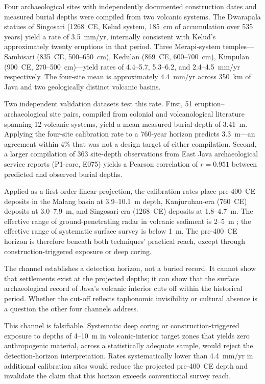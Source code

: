 \documentclass[12pt,a4paper]{article}
\begin{document}
Four archaeological sites with independently documented construction dates and measured burial depths were compiled from two volcanic systems. The Dwarapala statues of Singosari (1268~CE, Kelud system, 185~cm of accumulation over 535 years) yield a rate of 3.5~mm/yr, internally consistent with Kelud's approximately twenty eruptions in that period. Three Merapi-system temples---Sambisari (835~CE, 500--650~cm), Kedulan (869~CE, 600--700~cm), Kimpulan (900~CE, 270--500~cm)---yield rates of 4.4--5.7, 5.3--6.2, and 2.4--4.5~mm/yr respectively. The four-site mean is approximately 4.4~mm/yr across 350~km of Java and two geologically distinct volcanic basins.

Two independent validation datasets test this rate. First, 51 eruption--archaeological site pairs, compiled from colonial and volcanological literature spanning 12 volcanic systems, yield a mean measured burial depth of 3.41~m. Applying the four-site calibration rate to a 760-year horizon predicts 3.3~m---an agreement within 4\% that was not a design target of either compilation. Second, a larger compilation of 363 site-depth observations from East Java archaeological service reports (P1-core, E075) yields a Pearson correlation of $r=0.951$ between predicted and observed burial depths.

Applied as a first-order linear projection, the calibration rates place pre-400~CE deposits in the Malang basin at 3.9--10.1~m depth, Kanjuruhan-era (760~CE) deposits at 3.0--7.9~m, and Singosari-era (1268~CE) deposits at 1.8--4.7~m. The effective range of ground-penetrating radar in volcanic sediment is 2--5~m \citep{conyers2004,goodman2013}; the effective range of systematic surface survey is below 1~m. The pre-400~CE horizon is therefore beneath both techniques' practical reach, except through construction-triggered exposure or deep coring.

The channel establishes a detection horizon, not a buried record. It cannot show that settlements exist at the projected depths; it can show that the surface archaeological record of Java's volcanic interior cuts off within the historical period. Whether the cut-off reflects taphonomic invisibility or cultural absence is a question the other four channels address.

This channel is falsifiable. Systematic deep coring or construction-triggered exposure to depths of 4--10~m in volcanic-interior target zones that yields zero anthropogenic material, across a statistically adequate sample, would reject the detection-horizon interpretation. Rates systematically lower than 4.4~mm/yr in additional calibration sites would reduce the projected pre-400~CE depth and invalidate the claim that this horizon exceeds conventional survey reach.
\end{document}
